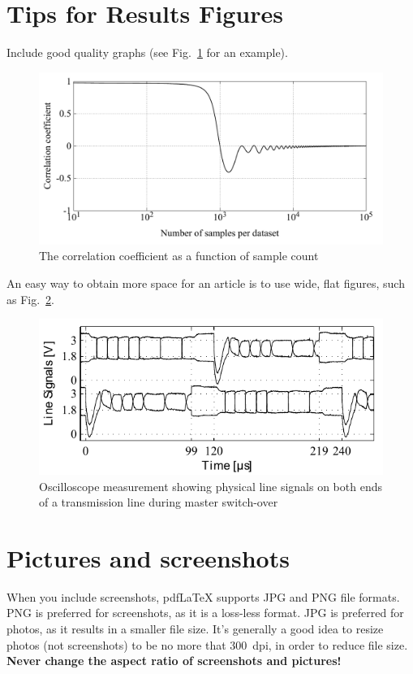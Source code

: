 \section{Tips for Results Figures}

Include good quality graphs (see Fig.~\ref{fig:r_vs_N_f=0_0005_P=90} for an example).

\begin{figure}[ht]
\centering
\includegraphics[width=0.8\columnwidth]{3_Chapters/5_Chapter_Results/Figures/r_vs_N_f=0_0005_P=90.pdf}
\caption{The correlation coefficient as a function of sample count}
\label{fig:r_vs_N_f=0_0005_P=90}
\end{figure}

An easy way to obtain more space for an article is to use wide, flat figures, such as Fig.~\ref{fig:Line_Signals}.

\begin{figure}[ht]
\centering
\includegraphics[width=0.8\columnwidth]{3_Chapters/5_Chapter_Results/Figures/Line_Signals.pdf}
\caption{Oscilloscope measurement showing physical line signals on both ends of a transmission line during master switch-over~\cite{Taylor_2016}}
\label{fig:Line_Signals}
\end{figure}


\section{Pictures and screenshots}

When you include screenshots, pdf\LaTeX{} supports JPG and PNG file formats.  PNG is preferred for screenshots, as it is a loss-less format.  JPG is preferred for photos, as it results in a smaller file size.  It's generally a good idea to resize photos (not screenshots) to be no more that 300~dpi, in order to reduce file size. \textbf{Never change the aspect ratio of screenshots and pictures!}

